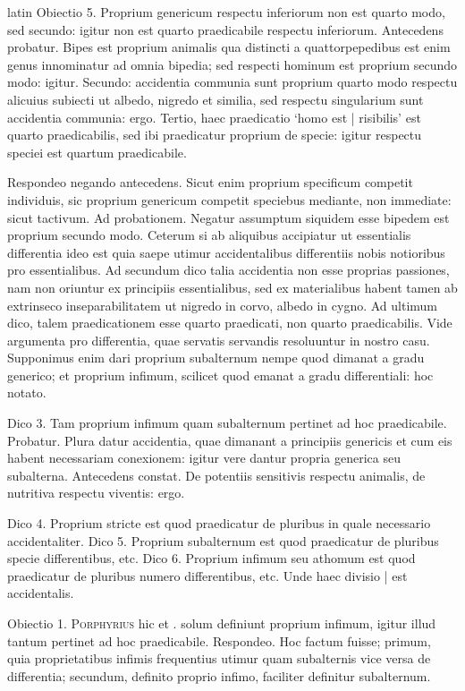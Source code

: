 \begin{otherlanguage*}{latin}
\pstart
Obiectio 5. Proprium genericum respectu inferiorum non est quarto modo, sed secundo:
igitur non est quarto praedicabile respectu inferiorum. Antecedens probatur. Bipes est proprium animalis qua distincti a quattorpepedibus est enim genus innominatur ad omnia bipedia; sed respecti hominum est proprium secundo modo:
igitur. Secundo:
accidentia communia sunt proprium quarto modo respectu alicuius subiecti ut albedo, nigredo et similia, sed respectu singularium sunt accidentia communia:
ergo. Tertio, haec praedicatio `homo est \textnormal{|} risibilis' est quarto praedicabilis, sed ibi praedicatur proprium de specie:
igitur respectu speciei est quartum praedicabile. 
\pend

\pstart
Respondeo negando antecedens. Sicut enim proprium specificum competit individuis, sic proprium genericum competit speciebus mediante, non immediate:
sicut tactivum. Ad probationem. Negatur assumptum siquidem esse bipedem est proprium secundo modo. Ceterum si ab aliquibus accipiatur ut essentialis differentia ideo est quia saepe utimur accidentalibus differentiis nobis notioribus pro essentialibus. Ad secundum dico talia accidentia non esse proprias passiones, nam non oriuntur ex principiis essentialibus, sed ex materialibus habent tamen ab extrinseco inseparabilitatem ut nigredo in corvo, albedo in cygno. Ad ultimum dico, talem praedicationem esse quarto praedicati, non quarto praedicabilis. Vide argumenta pro differentia, quae servatis servandis resoluuntur in nostro casu. Supponimus enim dari proprium subalternum nempe quod dimanat a gradu generico; et proprium infimum, scilicet quod emanat a gradu differentiali:
hoc notato. 
\pend

\pstart
Dico 3. Tam proprium infimum quam subalternum pertinet ad hoc praedicabile. Probatur. Plura datur accidentia, quae dimanant a principiis genericis et cum eis habent necessariam conexionem:
igitur vere dantur propria generica seu subalterna. Antecedens constat. De potentiis sensitivis respectu animalis, de nutritiva respectu viventis:
ergo. 
\pend

\pstart
Dico 4. Proprium stricte est quod praedicatur de pluribus in quale necessario accidentaliter. Dico 5. Proprium subalternum est quod praedicatur de pluribus specie differentibus, etc. Dico 6. Proprium infimum seu athomum est quod praedicatur de pluribus numero differentibus, etc. Unde haec divisio \textnormal{|} est accidentalis. 
\pend

\pstart
Obiectio 1. \textsc{Porphyrius} hic et . solum definiunt proprium infimum, igitur illud tantum pertinet ad hoc praedicabile. Respondeo. Hoc factum fuisse; primum, quia proprietatibus infimis frequentius utimur quam subalternis vice versa de differentia; secundum, definito proprio infimo, faciliter definitur subalternum. 
\pend


\end{otherlanguage*}

